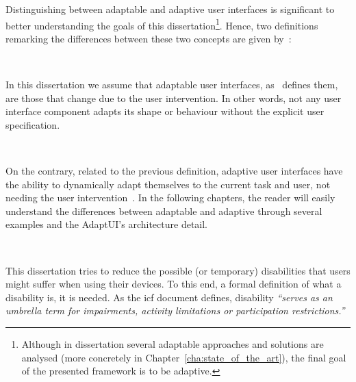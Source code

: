 \begin{description}
  Distinguishing between adaptable and adaptive user interfaces is significant
  to better understanding the goals of this dissertation\footnote{Although in
  dissertation several adaptable approaches and solutions are analysed (more
  concretely in Chapter~\ref{cha:state_of_the_art}), the final goal of the 
  presented framework is to be adaptive.}. Hence, two definitions remarking the 
  differences between these two concepts are given by~\citeauthor{fischer_user_2001}:
  
  \item[\Defi{Adaptable user interface, by~\citep{fischer_user_2001}}] \hfill \\
  \begin{mdframed}[hidealllines=true,backgroundcolor=gray!20]
  In this dissertation we assume that adaptable user interfaces,
  as~\citet{fischer_user_2001} defines them, are those that change due to the 
  user intervention. In other words, not any user interface component adapts its
  shape or behaviour without the explicit user specification.
  \end{mdframed}

  \item[\Defi{Adaptive user interface, by~\citep{fischer_user_2001}}] \hfill \\
  \begin{mdframed}[hidealllines=true,backgroundcolor=gray!20]
  On the contrary, related to the previous definition, adaptive user interfaces
  have the ability to dynamically adapt themselves to the current task and user,
  not needing the user intervention~\citep{fischer_user_2001}. In the following
  chapters, the reader will easily understand the differences between adaptable 
  and adaptive through several examples and the AdaptUI's architecture detail.
  \end{mdframed}

  \item[\Defi{User disability}] \hfill \\
  \begin{mdframed}[hidealllines=true,backgroundcolor=gray!20]
  This dissertation tries to reduce the possible (or temporary) disabilities 
  that users might suffer when using their devices. To this end, a formal 
  definition of what a disability is, it is needed. As the \ac{icf} document defines, 
  disability \textit{``serves as an umbrella term for impairments, activity 
  limitations or participation restrictions.''}
  \end{mdframed}


\end{description}
